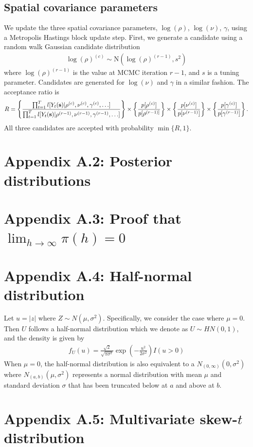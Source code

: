 \documentclass[11pt]{article}
\begin{document}
\subsection*{Spatial covariance parameters}
We update the three spatial covariance parameters, $\log(\rho)$, $\log(\nu)$, $\gamma$, using a Metropolis Hastings block update step.
First, we generate a candidate using a random walk Gaussian candidate distribution
\begin{align*}
	\log(\rho)^{(c)} \sim \text{N}(\log(\rho)^{(r - 1)}, s^2)
\end{align*}
where $\log(\rho)^{(r-1)}$ is the value at MCMC iteration $r - 1$, and $s$ is a tuning parameter.
Candidates are generated for $\log(\nu)$ and $\gamma$ in a similar fashion.
The acceptance ratio is
\begin{align*}
	R = \left\{ \frac{ \prod_{t = 1}^{T} l[Y_t(\mbox{\bf s}) | \rho^{(c)}, \nu^{(c)}, \gamma^{(c)}, \ldots] }{\prod_{t = 1}^{T} l[Y_t(\mbox{\bf s}) | \rho^{(r-1)}, \nu^{(r-1)}, \gamma^{(r-1)}, \ldots] } \right\} \times \left\{ \frac{ p[\rho^{(c)}] }{ p[\rho^{(r - 1)] } } \right\} \times \left\{ \frac{ p[\nu^{(c)}] }{ p[\nu^{(r - 1)}] } \right\} \times \left\{ \frac{ p[ \gamma^{(c)} ] }{ p[\gamma^{(r - 1)} ] } \right\}.
\end{align*}
All three candidates are accepted with probability $\min\{R, 1\}$.

\section*{Appendix A.2: Posterior distributions}





\section*{Appendix A.3: Proof that $\lim_{h \rightarrow \infty} \pi(h) = 0$}


\section*{Appendix A.4: Half-normal distribution}
Let $u = |z|$ where $Z \sim N(\mu, \sigma^2)$.
Specifically, we consider the case where $\mu = 0$. Then $U$ follows a half-normal distribution which we denote as $U \sim HN(0, 1)$, and the density is given by
\begin{align}
  f_U(u) = \frac{ \sqrt{2} }{ \sqrt{\pi \sigma^2} } \exp \left( - \frac{ u^2 }{ 2 \sigma^2 } \right) I(u > 0)
\end{align}
When $\mu = 0$, the half-normal distribution is also equivalent to a $N_{(0, \infty)}(0, \sigma^2)$ where $N_{(a, b)}(\mu, \sigma^2)$ represents a normal distribution with mean $\mu$ and standard deviation $\sigma$ that has been truncated below at $a$ and above at $b$.

\section*{Appendix A.5: Multivariate skew-$t$ distribution}




\end{document}
